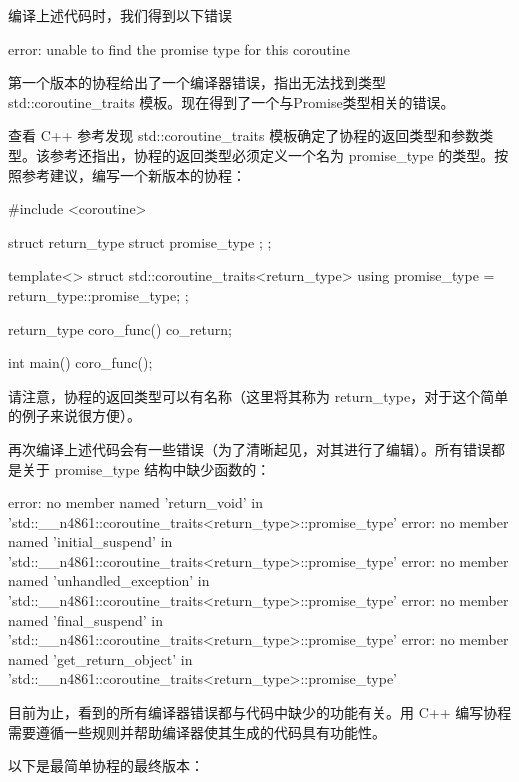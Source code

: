 编译上述代码时，我们得到以下错误

\begin{shell}
error: unable to find the promise type for this coroutine
\end{shell}

第一个版本的协程给出了一个编译器错误，指出无法找到类型 std::coroutine\_traits 模板。现在得到了一个与Promise类型相关的错误。

查看 C++ 参考发现 std::coroutine\_traits 模板确定了协程的返回类型和参数类型。该参考还指出，协程的返回类型必须定义一个名为 promise\_type 的类型。按照参考建议，编写一个新版本的协程：

\begin{cpp}
#include <coroutine>

struct return_type {
    struct promise_type {
    };
};

template<>
struct std::coroutine_traits<return_type> {
    using promise_type = return_type::promise_type;
};

return_type coro_func() {
    co_return;
}

int main() {
    coro_func();
}
\end{cpp}

请注意，协程的返回类型可以有名称（这里将其称为 return\_type，对于这个简单的例子来说很方便）。

再次编译上述代码会有一些错误（为了清晰起见，对其进行了编辑）。所有错误都是关于 promise\_type 结构中缺少函数的：

\begin{shell}
error: no member named 'return_void' in 'std::__n4861::coroutine_traits<return_type>::promise_type'
error: no member named 'initial_suspend' in 'std::__n4861::coroutine_traits<return_type>::promise_type'
error: no member named 'unhandled_exception' in 'std::__n4861::coroutine_traits<return_type>::promise_type'
error: no member named 'final_suspend' in 'std::__n4861::coroutine_traits<return_type>::promise_type'
error: no member named 'get_return_object' in 'std::__n4861::coroutine_traits<return_type>::promise_type'
\end{shell}

目前为止，看到的所有编译器错误都与代码中缺少的功能有关。用 C++ 编写协程需要遵循一些规则并帮助编译器使其生成的代码具有功能性。

以下是最简单协程的最终版本：

